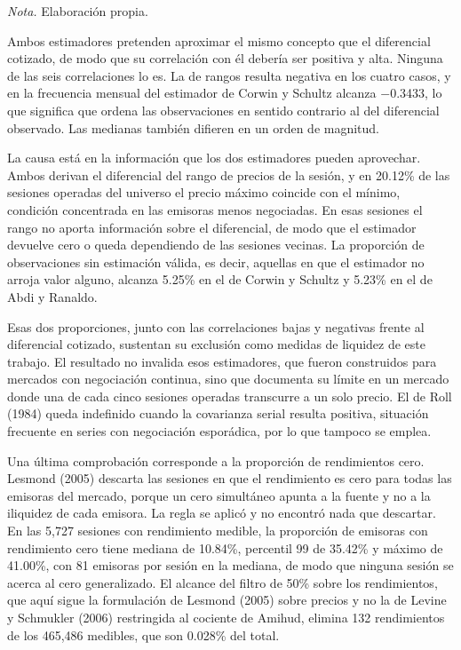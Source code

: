\emph{Nota.} Elaboración propia.

Ambos estimadores pretenden aproximar el mismo concepto que el diferencial cotizado, de modo que su correlación con él debería ser positiva y alta. Ninguna de las seis correlaciones lo es. La de rangos resulta negativa en los cuatro casos, y en la frecuencia mensual del estimador de Corwin y Schultz alcanza $-$0.3433, lo que significa que ordena las observaciones en sentido contrario al del diferencial observado. Las medianas también difieren en un orden de magnitud.

La causa está en la información que los dos estimadores pueden aprovechar. Ambos derivan el diferencial del rango de precios de la sesión, y en 20.12\% de las sesiones operadas del universo el precio máximo coincide con el mínimo, condición concentrada en las emisoras menos negociadas. En esas sesiones el rango no aporta información sobre el diferencial, de modo que el estimador devuelve cero o queda dependiendo de las sesiones vecinas. La proporción de observaciones sin estimación válida, es decir, aquellas en que el estimador no arroja valor alguno, alcanza 5.25\% en el de Corwin y Schultz y 5.23\% en el de Abdi y Ranaldo.

Esas dos proporciones, junto con las correlaciones bajas y negativas frente al diferencial cotizado, sustentan su exclusión como medidas de liquidez de este trabajo. El resultado no invalida esos estimadores, que fueron construidos para mercados con negociación continua, sino que documenta su límite en un mercado donde una de cada cinco sesiones operadas transcurre a un solo precio. El de Roll (1984) queda indefinido cuando la covarianza serial resulta positiva, situación frecuente en series con negociación esporádica, por lo que tampoco se emplea.

Una última comprobación corresponde a la proporción de rendimientos cero. Lesmond (2005) descarta las sesiones en que el rendimiento es cero para todas las emisoras del mercado, porque un cero simultáneo apunta a la fuente y no a la iliquidez de cada emisora. La regla se aplicó y no encontró nada que descartar. En las 5,727 sesiones con rendimiento medible, la proporción de emisoras con rendimiento cero tiene mediana de 10.84\%, percentil 99 de 35.42\% y máximo de 41.00\%, con 81 emisoras por sesión en la mediana, de modo que ninguna sesión se acerca al cero generalizado. El alcance del filtro de 50\% sobre los rendimientos, que aquí sigue la formulación de Lesmond (2005) sobre precios y no la de Levine y Schmukler (2006) restringida al cociente de Amihud, elimina 132 rendimientos de los 465,486 medibles, que son 0.028\% del total.

